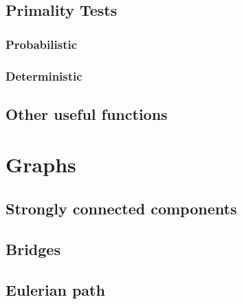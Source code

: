 \documentclass[10pt]{extarticle}
\begin{document}
\begin{multicols*}{3}
\subsection{Primality Tests} %

\subsubsection{Probabilistic}


\subsubsection{Deterministic}


\subsection{Other useful functions} %


\section{Graphs}

\subsection{Strongly connected components} %


\subsection{Bridges} %


\subsection{Eulerian path} %



\end{multicols*}
\end{document}
